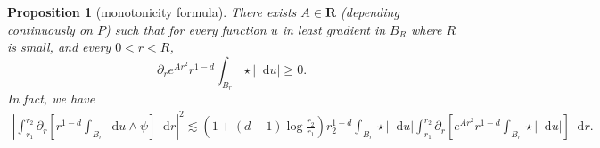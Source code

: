 \documentclass[reqno,12pt,letterpaper]{amsart}
\newcommand{\RR}{\mathbf{R}}
\newcommand*\dif{\mathop{}\!\mathrm{d}}
\newtheorem{proposition}[theorem]{Proposition}
\theoremstyle{definition}
\numberwithin{equation}{section}
\begin{document}
\begin{proposition}[monotonicity formula]\label{Monotonicity Formula}\label{sharp monotonicity}
There exists $A \in \RR$ (depending continuously on $P$) such that for every function $u$ in least gradient in $B_R$ where $R$ is small, and every $0 < r < R$,
\begin{equation}\label{weak monotone}
\partial_r e^{Ar^2} r^{1 - d} \int_{B_r} \star|\dif u| \geq 0.
\end{equation}
In fact, we have
\begin{align*}
\left|\int_{r_1}^{r_2} \partial_r \left[r^{1 - d}\int_{B_r} \dif u \wedge \psi\right] \dif r\right|^2 \lesssim \left(1 + (d - 1)\log\frac{r_2}{r_1}\right)r_2^{1 - d}\int_{B_r} \star |\dif u| \int_{r_1}^{r_2} \partial_r \left[e^{Ar^2} r^{1 - d}\int_{B_r} \star |\dif u|\right] \dif r.
\end{align*}
\end{proposition}
\end{document}
